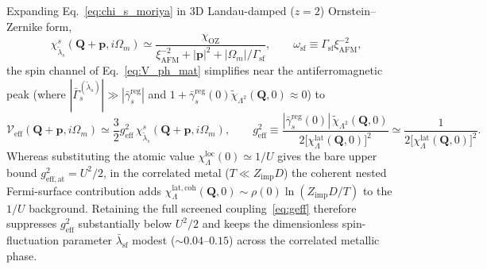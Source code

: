 \documentclass[11pt,a4paper]{article}
\numberwithin{equation}{section}
\theoremstyle{plain}
\theoremstyle{definition}
\providecommand{\vp}{\mathbf{p}}
\providecommand{\vQ}{\mathbf{Q}}
\begin{document}
Expanding Eq.~\eqref{eq:chi_s_moriya} in 3D Landau-damped ($z=2$) Ornstein--Zernike form,
\begin{equation}
    \chi^s_{\tilde{\lambda}_s}(\vQ + \vp, i\Omega_m)
    \simeq \frac{\chi_{\mathrm{OZ}}}{\xi_{\mathrm{AFM}}^{-2} + |\vp|^2 + |\Omega_m|/\Gamma_{\mathrm{sf}}},
    \qquad
    \omega_{\mathrm{sf}} \equiv \Gamma_{\mathrm{sf}}\xi_{\mathrm{AFM}}^{-2},
    \label{eq:OZ_3D}
\end{equation}
the spin channel of Eq.~\eqref{eq:V_ph_mat} simplifies near the antiferromagnetic peak
(where $|\bar{\Gamma}_s^{(\tilde{\lambda}_s)}| \gg |\bar{\gamma}_s^{\mathrm{reg}}|$ and
$1 + \bar{\gamma}_s^{\mathrm{reg}}(0)\tilde{\chi}_{\Lambda^2}(\vQ,0) \approx 0$) to
\begin{equation}
    \mathcal{V}_{\mathrm{eff}}(\vQ + \vp, i\Omega_m)
    \simeq \frac{3}{2} g_{\mathrm{eff}}^2\, \chi^s_{\tilde{\lambda}_s}(\vQ + \vp, i\Omega_m),
    \qquad
    g_{\mathrm{eff}}^2
    \equiv \frac{|\bar{\gamma}_s^{\mathrm{reg}}(0)|\,\tilde{\chi}_{\Lambda^2}(\vQ,0)}
                {2\bigl[\chi_\Lambda^{\mathrm{lat}}(\vQ,0)\bigr]^2}
    \simeq \frac{1}{2\bigl[\chi_\Lambda^{\mathrm{lat}}(\vQ,0)\bigr]^2}.
    \label{eq:geff}
\end{equation}
Whereas substituting the atomic value $\chi_\Lambda^{\mathrm{loc}}(0) \simeq 1/U$ gives
the bare upper bound $g_{\mathrm{eff,at}}^2 = U^2/2$, in the correlated metal
($T \ll Z_{\mathrm{imp}}D$) the coherent nested Fermi-surface contribution adds
$\chi_\Lambda^{\mathrm{lat,coh}}(\vQ,0) \sim \rho(0)\ln(Z_{\mathrm{imp}}D/T)$ to the
$1/U$ background. Retaining the full screened coupling~\eqref{eq:geff} therefore
suppresses $g_{\mathrm{eff}}^2$ substantially below $U^2/2$ and keeps the dimensionless
spin-fluctuation parameter $\bar{\lambda}_{\mathrm{sf}}$ modest ($\sim 0.04$--$0.15$)
across the correlated metallic phase.
\end{document}
